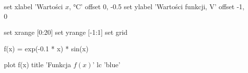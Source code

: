 \begin{gnuplot}[terminal = tikz]
	set xlabel 'Wartości $x$, \unit{\degreeCelsius}' offset 0, -0.5
	set ylabel 'Wartości funkcji, \unit{V}' offset -1, 0

	set xrange [0:20]
	set yrange [-1:1]
	set grid

	f(x) = exp(-0.1 * x) * sin(x)

	plot f(x) title 'Funkcja $f(x)$' lc 'blue'
\end{gnuplot}
